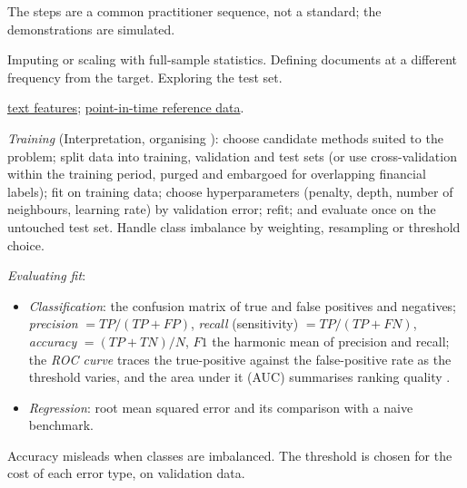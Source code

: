 \begin{qfmethod}
 The steps are a common practitioner sequence, not a standard; the demonstrations are simulated.

 Imputing or scaling with full-sample statistics. Defining documents at a different frequency from the target. Exploring the test set.

 \hyperref[meth:text-feature-engineering]{text features}; \hyperref[meth:bitemporal-reference-tables]{point-in-time reference data}.

\end{qfmethod}

\begin{qfmethod}\label{meth:ml-model-training-evaluation}
 \emph{Training} (Interpretation, organising \citep[pp.~198--206]{s6-isl}): choose candidate methods suited to the problem; split data into training, validation and test sets (or use cross-validation within the training period, purged and embargoed for overlapping financial labels); fit on training data; choose hyperparameters (penalty, depth, number of neighbours, learning rate) by validation error; refit; and evaluate once on the untouched test set. Handle class imbalance by weighting, resampling or threshold choice.

\emph{Evaluating fit}:
\begin{itemize}
\item \emph{Classification}: the confusion matrix of true and false positives and negatives; \emph{precision} $=TP/(TP+FP)$, \emph{recall} (sensitivity) $=TP/(TP+FN)$, \emph{accuracy} $=(TP+TN)/N$, $F1$ the harmonic mean of precision and recall; the \emph{ROC curve} traces the true-positive against the false-positive rate as the threshold varies, and the area under it (AUC) summarises ranking quality \citep[pp.~150--151]{s6-isl}.
\item \emph{Regression}: root mean squared error and its comparison with a naive benchmark.
\end{itemize}
Accuracy misleads when classes are imbalanced. The threshold is chosen for the cost of each error type, on validation data.


\end{qfmethod}
